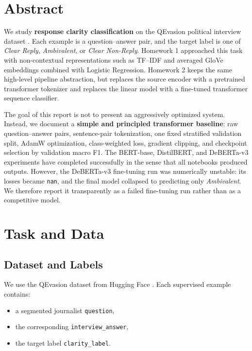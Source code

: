 \maketitle

{
  \hypersetup{linkcolor=black}
  \tableofcontents
}
\newpage

\section{Abstract}

We study \textbf{response clarity classification} on the QEvasion political interview dataset \cite{qevasion}. Each example is a question--answer pair, and the target label is one of \emph{Clear Reply}, \emph{Ambivalent}, or \emph{Clear Non-Reply}. Homework 1 approached this task with non-contextual representations such as TF--IDF and averaged GloVe embeddings combined with Logistic Regression. Homework 2 keeps the same high-level pipeline abstraction, but replaces the source encoder with a pretrained transformer tokenizer and replaces the linear model with a fine-tuned transformer sequence classifier.

The goal of this report is not to present an aggressively optimized system. Instead, we document a \textbf{simple and principled transformer baseline}: raw question--answer pairs, sentence-pair tokenization, one fixed stratified validation split, AdamW optimization, class-weighted loss, gradient clipping, and checkpoint selection by validation macro F1. The BERT-base, DistilBERT, and DeBERTa-v3 experiments have completed successfully in the sense that all notebooks produced outputs. However, the DeBERTa-v3 fine-tuning run was numerically unstable: its losses became \texttt{nan}, and the final model collapsed to predicting only \emph{Ambivalent}. We therefore report it transparently as a failed fine-tuning run rather than as a competitive model.

\section{Task and Data}

\subsection{Dataset and Labels}

We use the QEvasion dataset from Hugging Face \cite{qevasion}. Each supervised example contains:
\begin{itemize}
	\item a segmented journalist \texttt{question},
	\item the corresponding \texttt{interview\_answer},
	\item the target label \texttt{clarity\_label}.
\end{itemize}

